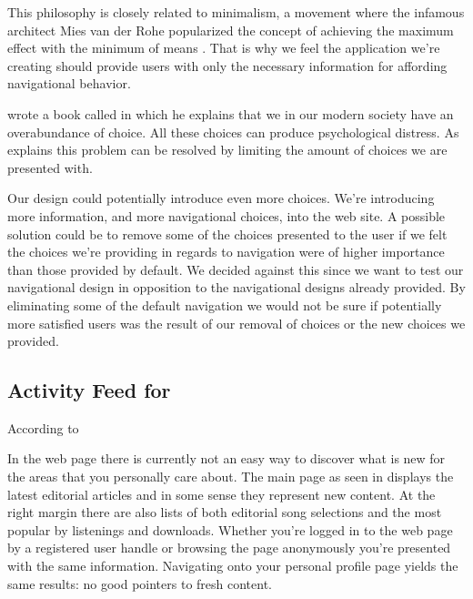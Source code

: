 This philosophy is closely related to minimalism, a movement where the
infamous architect Mies van der Rohe popularized the concept of
\dash{}achieving the maximum effect with the minimum of
means \citep{whitman69}.
That is why we feel the application we're creating should provide users
with only the necessary information for affording navigational behavior.

\citet{schwartz04} wrote a book called
 in which he explains that
we in our modern society have an overabundance of choice. All these choices
can produce psychological distress. As \citeauthor{schwartz04} explains this
problem can be resolved by limiting the amount of choices we are presented
with.

Our design could potentially introduce even more choices. We're
introducing more information, and more navigational choices, into the
\urort{} web site. A possible solution could be to remove some of the
choices presented to the user if we felt the choices we're providing in
regards to navigation were of higher importance than those provided by
default. We decided against this since we want to test our navigational
design in opposition to the navigational designs already provided. By
eliminating some of the default navigation we would not be sure
if potentially more satisfied users was the result of our removal of
choices or the new choices we provided.

\subsection{Activity Feed for \urort{}}

According to 

In the \urort{} web page there is currently not an easy way to discover what
is new for the areas that you personally care about. The main page
as seen in 
displays the latest editorial articles and in some sense they represent
new content. At the right margin there are also lists of both editorial song
selections and the most popular by listenings and downloads. Whether you're
logged in to the web page by a registered user handle or browsing the page
anonymously you're presented with the same information. Navigating onto your
personal profile page yields the same results: no good pointers to fresh
content.

